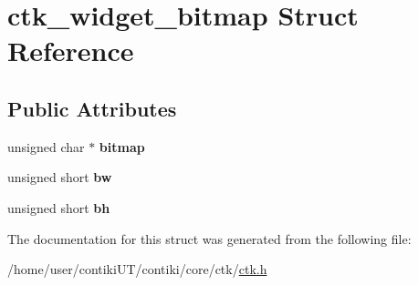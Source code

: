 \hypertarget{structctk__widget__bitmap}{}\section{ctk\+\_\+widget\+\_\+bitmap Struct Reference}
\label{structctk__widget__bitmap}
\subsection*{Public Attributes}
\begin{DoxyCompactItemize}
\item 
\hypertarget{structctk__widget__bitmap_aa3345ea1a359574eb1466357960eb5ee}{}unsigned char $\ast$ {\bfseries bitmap}\label{structctk__widget__bitmap_aa3345ea1a359574eb1466357960eb5ee}

\item 
\hypertarget{structctk__widget__bitmap_a1fb1b17e0c2c4ceb274a4f08b424bdb4}{}unsigned short {\bfseries bw}\label{structctk__widget__bitmap_a1fb1b17e0c2c4ceb274a4f08b424bdb4}

\item 
\hypertarget{structctk__widget__bitmap_afda16a2878432456af6bae682c72e311}{}unsigned short {\bfseries bh}\label{structctk__widget__bitmap_afda16a2878432456af6bae682c72e311}

\end{DoxyCompactItemize}


The documentation for this struct was generated from the following file\+:\begin{DoxyCompactItemize}
\item 
/home/user/contiki\+U\+T/contiki/core/ctk/\hyperlink{ctk_8h}{ctk.\+h}\end{DoxyCompactItemize}
